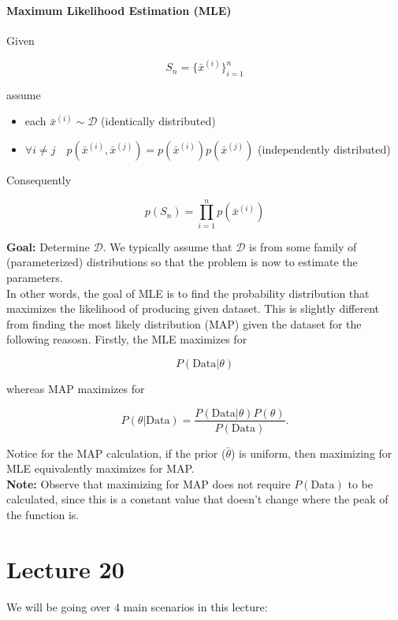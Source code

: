 \documentclass[12pt]{article}
\begin{document}
\subsection{Maximum Likelihood Estimation (MLE)}

Given 

\[ S_n = \{ \bar x^{(i)} \}_{i=1}^n \]

assume

\begin{itemize}
	\item each $\bar x^{(i)} \sim \mathcal{D}$ \hfill (identically distributed)
	\item $\forall i \ne j \quad p(\bar x^{(i)}, \bar x^{(j)}) = p(\bar x^{(i)}) p(\bar x^{(j)})$ \hfill (independently distributed)
\end{itemize}

Consequently

\[ p(S_n) = \prod_{i=1}^n p(\bar x^{(i)}) \]

\textbf{Goal: }Determine $\mathcal{D}$. We typically assume that $\mathcal{D}$ is from some family of (parameterized) distributions so that the problem is now to estimate the parameters.\\

In other words, the goal of MLE is to find the probability distribution that maximizes the likelihood of producing given dataset. This is slightly different from finding the most likely distribution (MAP) given the dataset for the following reasosn. Firstly, the MLE maximizes for

\[ P(\text{Data} | \theta) \]

whereas MAP maximizes for

\[ P(\theta| \text{Data}) = \frac {P(\text{Data}|\theta) P(\theta)} {P(\text{Data})}. \]

Notice for the MAP calculation, if the prior ($\bar{\theta}$) is uniform, then maximizing for MLE equivalently maximizes for MAP.\\


\textbf{Note:} Observe that maximizing for MAP does not require $P(\text{Data})$ to be calculated, since this is a constant value that doesn't change where the peak of the function is.


\part{Lecture 20}

We will be going over 4 main scenarios in this lecture:
\end{document}
